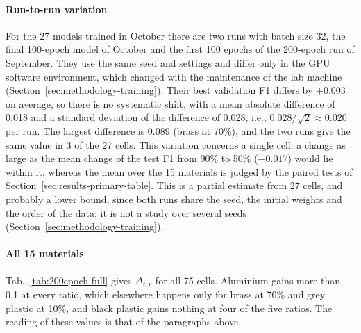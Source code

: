 \paragraph{Run-to-run variation}
For the 27 models trained in October there are two runs with batch size 32, the
final 100-epoch model of October and the first 100 epochs of the 200-epoch run of
September. They use the same
seed and settings and differ only in the GPU software environment, which changed with
the maintenance of the lab machine (Section~\ref{sec:methodology-training}). Their best validation F1 differs by $+0.003$ on average,
so there is no systematic shift, with a mean absolute difference of 0.018 and a
standard deviation of the difference of 0.028, i.e., $0.028/\sqrt{2} \approx 0.020$ per run. The largest
difference is 0.089 (brass at 70\%), and the two runs give the same value in 3 of the
27 cells. This variation concerns a single cell: a change as large as the mean change of
the test F1 from 90\% to 50\% ($-0.017$) would lie within it, whereas the mean over the
15 materials is judged by the paired tests of Section~\ref{sec:results-primary-table}. This is a partial estimate from 27 cells, and probably a lower bound, since both runs
share the seed, the initial weights and the order of the data; it is not a study over
several seeds
(Section~\ref{sec:methodology-training}).

\paragraph{All 15 materials}
\label{sec:results-200epoch-full}

Tab.~\ref{tab:200epoch-full} gives $\Delta_{t,r}$ for all 75 cells. Aluminium gains
more than 0.1 at every ratio, which elsewhere happens only for brass at 70\% and grey
plastic at 10\%, and black plastic gains nothing at four of the five ratios. The reading of these values is that of
the paragraphs above.

